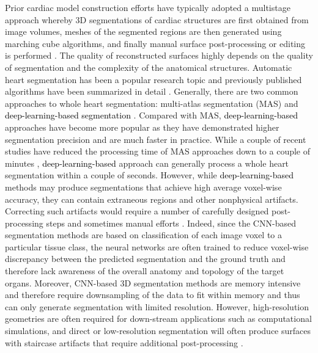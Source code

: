 \documentclass[times,review,preprint,authoryear]{elsarticle}
\begin{document}
Prior cardiac model construction efforts have typically adopted a multistage approach whereby 3D segmentations of cardiac structures are first obtained from image volumes, meshes of the segmented regions are then generated using marching cube algorithms, and finally manual surface post-processing or editing is performed \citep{Lorensen1987, KONG2020, Maher2019, Augustin2016EM}. The quality of reconstructed surfaces highly depends on the quality of segmentation and the complexity of the anatomical structures. Automatic heart segmentation has been a popular research topic and previously published algorithms have been summarized in detail \citep{Zhuang2013, ZHUANG2019, Peng2016, Habijan2020}. Generally, there are two common approaches to whole heart segmentation: multi-atlas segmentation (MAS) \citep{BAI201598, Zhuang2015MAS, ZHUANG2016MAS} and \textcolor{black}{deep-learning-based segmentation} \citep{Ronneberger2015, cicek3DUNET}. Compared with MAS, \textcolor{black}{deep-learning-based} approaches have become more popular as they have demonstrated higher segmentation precision \citep{ZHUANG2019, Payer2018} and are much faster in practice. While a couple of recent studies have reduced the processing time of MAS approaches down to a couple of minutes \citep{Bui2020, BUI2020104019}, \textcolor{black}{deep-learning-based} approach can generally process a whole heart segmentation within a couple of seconds. However, while \textcolor{black}{deep-learning-based} methods may produce segmentations that achieve high average voxel-wise accuracy, they can contain extraneous regions and other nonphysical artifacts. Correcting such artifacts would require a number of carefully designed post-processing steps and sometimes manual efforts \citep{KONG2020}. Indeed, since the CNN-based segmentation methods are based on classification of each image voxel to a particular tissue class, the neural networks are often trained to reduce voxel-wise discrepancy between the predicted segmentation and the ground truth and therefore lack awareness of the overall anatomy and topology of the target organs. Moreover, CNN-based 3D segmentation methods are memory intensive and therefore require downsampling of the data to fit within memory and thus can only generate segmentation with limited resolution. However, high-resolution geometries are often required for down-stream applications such as computational simulations, and direct or low-resolution segmentation will often produce surfaces with staircase artifacts that require additional post-processing \citep{Wei2018, WEI20131223, UPDEGROVE201616}. 
\end{document}
